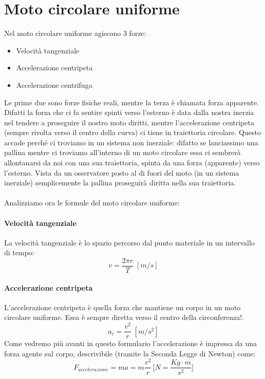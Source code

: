     \section{Moto circolare uniforme}
        Nel moto circolare uniforme agiscono 3 forze:
        \begin{itemize}
            \item Velocità tangenziale
            \item Accelerazione centripeta
            \item Accelerazione centrifuga
        \end{itemize}
        Le prime due sono forze fisiche reali, mentre la terza è chiamata forza
        apparente. Difatti la forza che ci fa sentire spinti verso l'esterno è
        data dalla nostra inerzia nel tendere a proseguire il nostro moto 
        diritti, mentre l'accelerazione centripeta (sempre rivolta verso il
        centro della curva) ci tiene in traiettoria circolare. Questo accade
        perché ci troviamo in un sistema non inerziale: difatto se lanciassimo 
        una pallina mentre ci troviamo all'interno di un moto circolare essa ci
        sembrerà allontanarsi da noi con una sua traiettoria, spinta da una 
        forza (apparente) verso l'esterno. Vista da un osservatore posto al di
        fuori del moto (in un sistema inerziale) semplicemente la pallina 
        proseguirà diritta nella sua traiettoria.\\\\
        Analizziamo ora le formule del moto circolare uniforme:

        \paragraph{Velocità tangenziale} La velocità tangenziale è lo spazio 
        percorso dal punto materiale in un intervallo di tempo:
        \begin{equation}
            v = \frac{2\pi r}{T} \; [m/s]
        \end{equation}

        \paragraph{Accelerazione centripeta} L'accelerazione centripeta è 
        quella forza che mantiene un corpo in un moto circolare uniforme. Essa
        è sempre diretta verso il centro della circonferenza!.
        \begin{equation}
            a_c = \frac{v^2}{r} \; [m/s^2]
        \end{equation}
        Come vedremo più avanti in questo formulario l'accelerazione è impressa
        da una forza agente sul corpo, descrivibile (tramite la Seconda Legge
        di Newton) come:
        \begin{equation}
            F_{accelerazione} = ma = m\frac{v^2}{r} \, \Bigg[N = 
            \frac{Kg \cdot m}{s^2} \Bigg]
        \end{equation}

